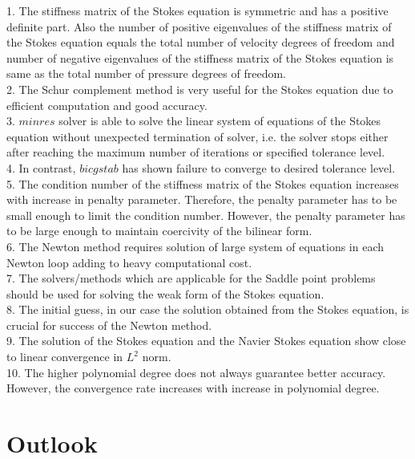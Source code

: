 \documentclass[a4paper,twoside,openright]{book}
\begin{document}
1. The stiffness matrix of the Stokes equation is symmetric and has a positive definite part. Also the number of positive eigenvalues of the stiffness matrix of the Stokes equation equals the total number of velocity degrees of freedom and number of negative eigenvalues of the stiffness matrix of the Stokes equation is same as the total number of pressure degrees of freedom.\\

2. The Schur complement method is very useful for the Stokes equation due to efficient computation and good accuracy. \\

3. $minres$ solver is able to solve the linear system of equations of the Stokes equation without unexpected termination of solver, i.e. the solver stops either after reaching the maximum number of iterations or specified tolerance level.\\

4. In contrast, $bicgstab$ has shown failure to converge to desired tolerance level.\\

5. The condition number of the stiffness matrix of the Stokes equation increases with increase in penalty parameter. Therefore, the penalty parameter has to be small enough to limit the condition number. However, the penalty parameter has to be large enough to maintain coercivity of the bilinear form. \\

6. The Newton method requires solution of large system of equations in each Newton loop adding to heavy computational cost.\\

7. The solvers/methods which are applicable for the Saddle point problems should be used for solving the weak form of the Stokes equation.\\

8. The initial guess, in our case the solution obtained from the Stokes equation, is crucial for success of the Newton method.\\

9. The solution of the Stokes equation and the Navier Stokes equation show close to linear convergence in $L^2$ norm.\\

10. The higher polynomial degree does not always guarantee better accuracy. However, the convergence rate increases with increase in polynomial degree.

\section{Outlook}
\end{document}
